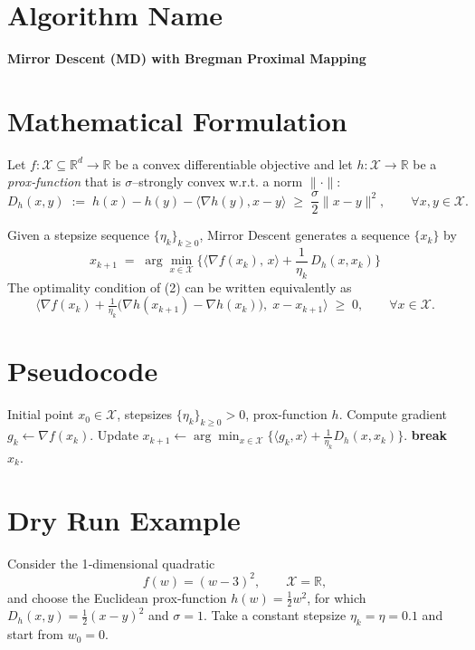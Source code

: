 \documentclass{article}
\begin{document}
\section*{Algorithm Name}
\textbf{Mirror Descent (MD) with Bregman Proximal Mapping}

\section*{Mathematical Formulation}
Let $f:\mathcal X\subseteq\mathbb R^{d}\to\mathbb R$ be a convex differentiable objective and let $h:\mathcal X\to\mathbb R$ be a \emph{prox‑function} that is $\sigma$–strongly convex w.r.t. a norm $\|\cdot\|$:
\[
D_{h}(x,y)\;:=\;h(x)-h(y)-\langle\nabla h(y),x-y\rangle\;\ge\;\frac{\sigma}{2}\|x-y\|^{2},
\qquad\forall x,y\in\mathcal X. \tag{1}
\]

Given a stepsize sequence $\{\eta_{k}\}_{k\ge0}$, Mirror Descent generates a sequence $\{x_{k}\}$ by
\[
\boxed{
x_{k+1}\;=\;\arg\min_{x\in\mathcal X}\Big\{\langle\nabla f(x_{k}),\,x\rangle+\frac{1}{\eta_{k}}\,D_{h}(x,x_{k})\Big\}
}\tag{2}
\]
The optimality condition of (2) can be written equivalently as
\[
\big\langle\nabla f(x_{k})+\tfrac{1}{\eta_{k}}\big(\nabla h(x_{k+1})-\nabla h(x_{k})\big),\;x-x_{k+1}\big\rangle\;\ge\;0,
\qquad\forall x\in\mathcal X. \tag{3}
\]

\section*{Pseudocode}
\begin{algorithm}[H]
\caption{Mirror Descent}
\begin{algorithmic}[1]
\REQUIRE Initial point $x_{0}\in\mathcal X$, stepsizes $\{\eta_{k}\}_{k\ge0}>0$, prox‑function $h$.
    \STATE Compute gradient $g_{k}\gets\nabla f(x_{k})$.
    \STATE Update $x_{k+1}\gets\arg\min_{x\in\mathcal X}\big\{\langle g_{k},x\rangle+\frac{1}{\eta_{k}}D_{h}(x,x_{k})\big\}$.
        \STATE \textbf{break}
    \ENDIF
\ENDFOR
\RETURN $x_{k}$.
\end{algorithmic}
\end{algorithm}

\section*{Dry Run Example}
Consider the 1‑dimensional quadratic
\[
f(w)=(w-3)^{2},\qquad\mathcal X=\mathbb R,
\]
and choose the Euclidean prox‑function $h(w)=\tfrac12 w^{2}$, for which $D_{h}(x,y)=\tfrac12 (x-y)^{2}$ and $\sigma=1$.
Take a constant stepsize $\eta_{k}=\eta=0.1$ and start from $w_{0}=0$.
\end{document}
